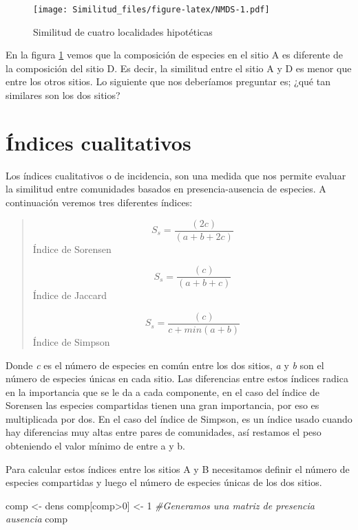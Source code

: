 \documentclass[]{book}
\newenvironment{Shaded}{\begin{snugshade}}{\end{snugshade}}
\newcommand{\DecValTok}[1]{\textcolor[rgb]{0.00,0.00,0.81}{{#1}}}
\newcommand{\StringTok}[1]{\textcolor[rgb]{0.31,0.60,0.02}{{#1}}}
\newcommand{\CommentTok}[1]{\textcolor[rgb]{0.56,0.35,0.01}{\textit{{#1}}}}
\newcommand{\NormalTok}[1]{{#1}}
\begin{document}
\begin{figure}[htbp]
\centering
\texttt{[image: Similitud\_files/figure-latex/NMDS-1.pdf]}
\caption{\label{fig:NMDS}Similitud de cuatro localidades hipotéticas}
\end{figure}

En la figura \ref{fig:NMDS} vemos que la composición de especies en el
sitio A es diferente de la composición del sitio D. Es decir, la
similitud entre el sitio A y D es menor que entre los otros sitios. Lo
siguiente que nos deberíamos preguntar es; ¿qué tan similares son los
dos sitios?

\section{Índices cualitativos}\label{indices-cualitativos}

Los índices cualitativos o de incidencia, son una medida que nos permite
evaluar la similitud entre comunidades basados en presencia-ausencia de
especies. A continuación veremos tres diferentes índices:

\begin{quote}
\[S_s= \frac{(2c)}{(a+b+2c)}\] Índice de Sorensen

\[S_s= \frac{(c)}{(a+b+c)}\] Índice de Jaccard

\[S_s= \frac{(c)}{c+min(a+b)}\] Índice de Simpson
\end{quote}

Donde \emph{c} es el número de especies en común entre los dos sitios,
\emph{a} y \emph{b} son el número de especies únicas en cada sitio. Las
diferencias entre estos índices radica en la importancia que se le da a
cada componente, en el caso del índice de Sorensen las especies
compartidas tienen una gran importancia, por eso es multiplicada por
dos. En el caso del índice de Simpson, es un índice usado cuando hay
diferencias muy altas entre pares de comunidades, así restamos el peso
obteniendo el valor mínimo de entre a y b.

Para calcular estos índices entre los sitios A y B necesitamos definir
el número de especies compartidas y luego el número de especies únicas
de los dos sitios.

\begin{Shaded}
\begin{Highlighting}[]
\NormalTok{comp <-}\StringTok{ }\NormalTok{dens}
\NormalTok{comp[comp>}\DecValTok{0}\NormalTok{] <-}\StringTok{ }\DecValTok{1} \CommentTok{#Generamos una matriz de presencia ausencia}
\NormalTok{comp}
\end{Highlighting}
\end{Shaded}
\end{document}
